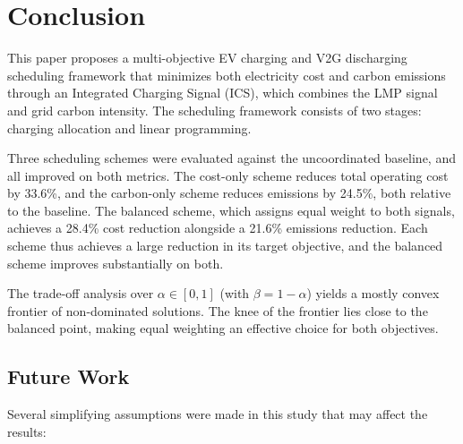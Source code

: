 \documentclass[sustainability,article,submit,moreauthors,pdftex]{Definitions/mdpi}
\begin{document}
\section{Conclusion}
\label{sec:conclusion}

This paper proposes a multi-objective EV charging and V2G discharging scheduling framework that minimizes both electricity cost and carbon emissions through an Integrated Charging Signal (ICS), which combines the LMP signal and grid carbon intensity. The scheduling framework consists of two stages: charging allocation and linear programming.

Three scheduling schemes were evaluated against the uncoordinated baseline, and all improved on both metrics. The cost-only scheme reduces total operating cost by 33.6\%, and the carbon-only scheme reduces emissions by 24.5\%, both relative to the baseline. The balanced scheme, which assigns equal weight to both signals, achieves a 28.4\% cost reduction alongside a 21.6\% emissions reduction. Each scheme thus achieves a large reduction in its target objective, and the balanced scheme improves substantially on both.

The trade-off analysis over $\alpha \in [0,1]$ (with $\beta = 1 - \alpha$) yields a mostly convex frontier of non-dominated solutions. The knee of the frontier lies close to the balanced point, making equal weighting an effective choice for both objectives.


\subsection{Future Work}

Several simplifying assumptions were made in this study that may affect the results:
\end{document}
